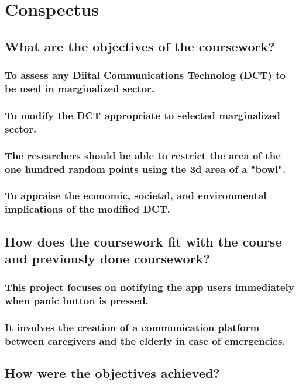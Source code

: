 \section{Conspectus}
\label{sec:cnspcts}

\IEEEpubidadjcol %

\subsection{What are the objectives of the coursework?}

\subsubsection{To assess any Diital Communications Technolog (DCT) to be used in marginalized sector.}
\subsubsection{To modify the DCT appropriate to selected marginalized sector.}
\subsubsection{The researchers should be able to restrict the area of the one hundred random points using the 3d area of a "bowl".}
\subsubsection{To appraise the economic, societal, and environmental implications of the modified DCT.}

\subsection{How does the coursework fit with the course and previously done coursework?}
\subsubsection{This project focuses on notifying the app users immediately when panic button is pressed.}
\subsubsection{It involves the creation of a communication platform between caregivers and the elderly in case of emergencies.}

\subsection{How were the objectives achieved?}
